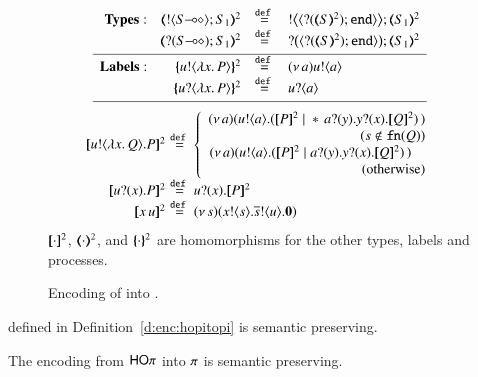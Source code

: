 \begin{figure}[t]
\[
\begin{array}{l}
	\begin{array}{rcl}
\noindent{\bf Types:}\quad 
		\tmap{\btout{\lhot{S}}S_1}{2} & \defeq & \bbtout{\chtype{\btinp{\tmap{S}{2}}\tinact}}\tmap{S_1}{2} \\
		\tmap{\btinp{\lhot{S}}S_1}{2} & \defeq & \bbtinp{\chtype{\btinp{\tmap{S}{2}}\tinact}}\tmap{S_1}{2} 
\\[1mm]
\hline
\noindent{\bf Labels:}\quad \quad 
		\mapa{\bactout{u}{\abs{ x}{P}} }^2  & \defeq & \news{a} \bactout{u}{a} \\
		\mapa{\bactinp{u}{\abs{ x}{P}} }^2 &  \defeq & \bactinp{u}{a}
\\[1mm]
\hline
\end{array}
\end{array}
\]
\[
\begin{array}{rcll}
		\pmap{\bout{u}{\abs{x}{Q}} P}{2} &\!\!\!\! \defeq \!\!\!\!&  \left\{
		\begin{array}{r}
			\newsp{a}{\bout{u}{a} (\pmap{P}{2} \Par \repl{} \binp{a}{y} \binp{y}{x} \pmap{Q}{2})\,}\\
                  (s \notin \fn{Q}) \\
			\newsp{a}{\bout{u}{a} (\pmap{P}{2} \Par \binp{a}{y} \binp{y}{x} \pmap{Q}{2})\,}\quad\\
            \textrm{(otherwise)} %
		\end{array}
		\right.
		\\
\pmap{\binp{u}{x} P}{2} &\!\!\!\! \defeq \!\!\!\! &  \binp{u}{x} \pmap{P}{2}\\
\pmap{\appl{x}{u}}{2} & \!\!\!\! \defeq \!\!\!\! & \newsp{s}{\bout{x}{s} \bout{\dual{s}}{u} \inact}\\

	\end{array}
	\]
$[\!\![\cdot]\!\!]^2$,
$(\!\!\langle\cdot\rangle\!\!)^2$, 
and 
$\{\!\!\{\cdot\}\!\!\}^2$
are homomorphisms for the other types, labels and processes.   
	\caption{
Encoding of \HO into \sessp.
\label{f:enc:ho_to_sessp}
}
\end{figure}

\begin{theorem}
\label{f:enc:hotopi}
defined in 
Definition~\ref{d:enc:hopitopi} 
is semantic preserving. 
\end{theorem}

\begin{corollary}
The encoding from $\mathsf{HO}\pi$ into $\pi$ is semantic preserving. 
\end{corollary}




